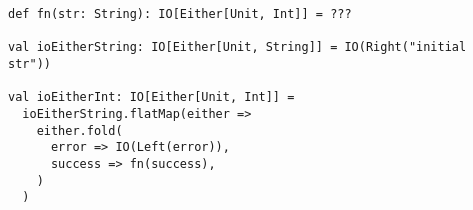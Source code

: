 \begin{algorithm}

\begin{verbatim}
def fn(str: String): IO[Either[Unit, Int]] = ???

val ioEitherString: IO[Either[Unit, String]] = IO(Right("initial str"))

val ioEitherInt: IO[Either[Unit, Int]] =
  ioEitherString.flatMap(either =>
    either.fold(
      error => IO(Left(error)),
      success => fn(success),
    )
  )
\end{verbatim}

\caption{Syntax overhead of nesting Either and IO monads. %
\label{monadtransformer:io-either}}
\end{algorithm}